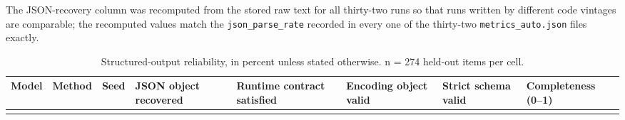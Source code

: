 The JSON-recovery column was recomputed from the stored raw text for all thirty-two runs so that runs written by different code vintages are comparable; the recomputed values match the \texttt{json\_parse\_rate} recorded in every one of the thirty-two \texttt{metrics\_auto.json} files exactly.

\begin{landscape}
\begingroup\scriptsize\setlength{\tabcolsep}{1pt}\sloppy
\begin{longtable}[]{@{}
  >{\raggedright\arraybackslash}p{}
  >{\raggedright\arraybackslash}p{}
  >{\raggedleft\arraybackslash}p{}
  >{\raggedleft\arraybackslash}p{}
  >{\raggedleft\arraybackslash}p{}
  >{\raggedleft\arraybackslash}p{}
  >{\raggedleft\arraybackslash}p{}
  >{\raggedleft\arraybackslash}p{}@{}}
\caption{Structured-output reliability, in percent unless stated otherwise. n = 274 held-out items per cell.}\tabularnewline
\toprule\noalign{}
\begin{minipage}[b]{\linewidth}\raggedright
Model
\end{minipage} & \begin{minipage}[b]{\linewidth}\raggedright
Method
\end{minipage} & \begin{minipage}[b]{\linewidth}\raggedleft
Seed
\end{minipage} & \begin{minipage}[b]{\linewidth}\raggedleft
JSON object recovered
\end{minipage} & \begin{minipage}[b]{\linewidth}\raggedleft
Runtime contract satisfied
\end{minipage} & \begin{minipage}[b]{\linewidth}\raggedleft
Encoding object valid
\end{minipage} & \begin{minipage}[b]{\linewidth}\raggedleft
Strict schema valid
\end{minipage} & \begin{minipage}[b]{\linewidth}\raggedleft
Completeness (0--1)
\end{minipage} \\
\midrule\noalign{}

\end{longtable}
\end{landscape}
